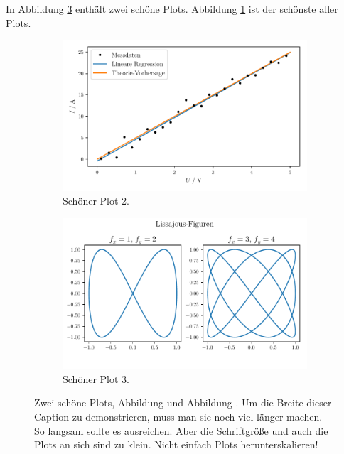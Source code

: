 \documentclass{scrartcl}
\begin{document}
In Abbildung \ref{fig:subfigs} enthält zwei schöne Plots.
Abbildung \ref{fig:plot2} ist der schönste aller Plots.
\begin{figure}
  \hspace*{\fill}
  \begin{subfigure}{0.40\textwidth}
    \centering
    \includegraphics[width=\textwidth]{plot2.pdf}
    \caption{Schöner Plot 2.}
    \label{fig:plot2}
  \end{subfigure}
  \hspace*{\fill}
  \begin{subfigure}{0.40\textwidth}
    \centering
    \includegraphics[width=\textwidth]{plot3.pdf}
    \caption{Schöner Plot 3.}
    \label{fig:plot3}
  \end{subfigure}
  \hspace*{\fill}
  \caption{
    Zwei schöne Plots, Abbildung  und Abbildung .
    Um die Breite dieser Caption zu demonstrieren, muss man sie noch viel länger machen. 
    So langsam sollte es ausreichen.
    Aber die Schriftgröße und auch die Plots an sich sind zu klein.
    Nicht einfach Plots herunterskalieren!
  }
  \label{fig:subfigs}
\end{figure}
\end{document}
